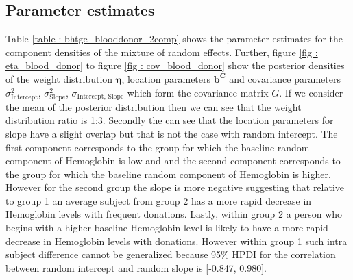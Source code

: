\subsection{Parameter estimates}
Table \ref{table : bhtge_blooddonor_2comp} shows the parameter estimates for the component densities of the mixture of random effects. Further, figure \ref{fig : eta_blood_donor} to figure \ref{fig : cov_blood_donor} show the posterior densities of the weight distribution $\boldsymbol{\eta}$, location parameters $\boldsymbol{b^C}$ and covariance parameters $\sigma^2_\text{Intercept}$, $\sigma^2_\text{Slope}$, $\sigma_\text{Intercept, Slope}$ which form the covariance matrix $G$. If we consider the mean of the posterior distribution then we can see that the weight distribution ratio is 1:3. Secondly the can see that the location parameters for slope have a slight overlap but that is not the case with random intercept. The first component corresponds to the group for which the baseline random component of Hemoglobin is low and and the second component corresponds to the group for which the baseline random component of Hemoglobin is higher. However for the second group the slope is more negative suggesting that relative to group 1 an average subject from group 2 has a more rapid decrease in Hemoglobin levels with frequent donations. 
Lastly, within group 2 a person who begins with a higher baseline Hemoglobin level is likely to have a more rapid decrease in Hemoglobin levels with donations. However within group 1 such intra subject difference cannot be generalized because 95\% HPDI for the correlation between random intercept and random slope is [-0.847, 0.980].

